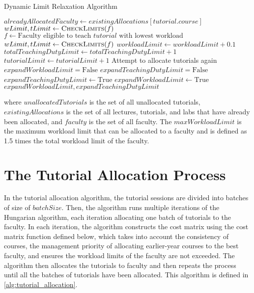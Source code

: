 \begin{algorithm}[H]
  \caption*{Dynamic Limit Relaxation Algorithm}
  \begin{algorithmic}
    \State $alreadyAllocatedFaculty \gets existingAllocations[tutorial.course]$
    \State $wLimit, tLimit \gets \Call{CheckLimits}{f}$
    \EndFor
    \Else
    \State $f \gets \text{Faculty eligible to teach $tutorial$ with lowest workload}$
    \State $wLimit, tLimit \gets \Call{CheckLimits}{f}$
    \EndIf
    \EndFor
    \State $workloadLimit \gets workloadLimit + 0.1$
    \EndIf
    \State $totalTeachingDutyLimit \gets totalTeachingDutyLimit + 1$
    \State $tutorialLimit \gets tutorialLimit + 1$
    \EndIf
    \State Attempt to allocate tutorials again
    \EndWhile
    \EndProcedure
    \\
    \State $expandWorkloadLimit = \text{False}$
    \State $expandTeachingDutyLimit = \text{False}$
    \State $expandTeachingDutyLimit \gets \text{True}$
    \EndIf
    \State $expandWorkloadLimit \gets \text{True}$
    \EndIf
    \State \Return $expandWorkloadLimit, expandTeachingDutyLimit$
    \EndProcedure
  \end{algorithmic}
\end{algorithm}

where $unallocatedTutorials$ is the set of all unallocated tutorials, $existingAllocations$ is the set of all lectures, tutorials, and labs that have already been allocated, and $faculty$ is the set of all faculty. The $maxWorkloadLimit$ is the maximum workload limit that can be allocated to a faculty and is defined as 1.5 times the total workload limit of the faculty.

\section{The Tutorial Allocation Process}

In the tutorial allocation algorithm, the tutorial sessions are divided into batches of size of $batchSize$. Then, the algorithm runs multiple iterations of the Hungarian algorithm, each iteration allocating one batch of tutorials to the faculty. In each iteration, the algorithm constructs the cost matrix using the cost matrix function defined below, which takes into account the consistency of courses, the management priority of allocating earlier-year courses to the best faculty, and ensures the workload limits of the faculty are not exceeded. The algorithm then allocates the tutorials to faculty and then repeats the process until all the batches of tutorials have been allocated. This algorithm is defined in \autoref{alg:tutorial_allocation}.

